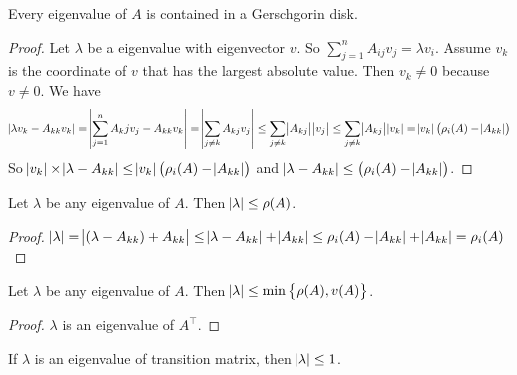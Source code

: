 \begin{theorem}
    Every eigenvalue of $A$ is contained in a Gerschgorin disk.    
\end{theorem}
\begin{proof}
    Let $\lambda$ be a eigenvalue with eigenvector $v$. So $\displaystyle \sum_{j=1}^n A_{ij} v_j = \lambda v_i$. Assume $v_k$ is the coordinate of $v$ that has the largest absolute value. Then $v_k \neq 0$ because $v \neq 0$. We have
    \begin{equation*}
        \begin{aligned}
            \absolutevalue{\lambda v_k - A_{kk} v_k} = \absolutevalue{\sum_{j=1}^n A_kj v_j - A_{kk} v_k} = \absolutevalue{\sum_{j \neq k} A_{kj} v_j} \leq \sum_{j \neq k} \absolutevalue{A_{kj}} \absolutevalue{v_j} \leq \sum_{j \neq k} \absolutevalue{A_{kj}} \absolutevalue{v_k} = \absolutevalue{v_k} \mleft(\rho_i (A) - \absolutevalue{A_{kk}} \mright)
        \end{aligned}
    \end{equation*}
    So $\absolutevalue{v_k} \times \absolutevalue{\lambda - A_{kk} } \leq \absolutevalue{v_k} \mleft(\rho_i (A) - \absolutevalue{A_{kk}} \mright)$ and $\absolutevalue{\lambda - A_{kk} } \leq \mleft(\rho_i (A) - \absolutevalue{A_{kk}} \mright)$.
\end{proof}

\begin{theorem}
    Let $\lambda$ be any eigenvalue of $A$. Then $\abs{\lambda} \leq \rho(A)$.
\end{theorem}
\begin{proof}
    $\displaystyle \abs{\lambda} = \abs{(\lambda - A_{kk}) + A_{kk}} \leq \abs{\lambda - A_{kk}} + \abs{A_{kk}} \leq \rho_i (A) - \abs{A_{kk}}  + \abs{A_{kk}}  = \rho_i (A)$
\end{proof}

\begin{theorem}
    Let $\lambda$ be any eigenvalue of $A$. Then $\abs{\lambda} \leq \min \set{\rho(A), v(A)}$.
\end{theorem}
\begin{proof}
    $\lambda$ is an eigenvalue of $A^\top$.
\end{proof}

\begin{theorem}
    If $\lambda$ is an eigenvalue of transition matrix, then $\abs{\lambda} \leq 1$.
\end{theorem}


